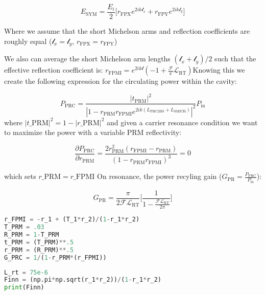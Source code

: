 \begin{equation} E_\mathrm{SYM}  = \frac{E_i}{2} \Big[ r_\mathrm{FPX}e^{2ik\mathscr{l}_x} + r_\mathrm{FPY}e^{2ik\mathscr{l}_y} \Big] \end{equation}

Where we assume that the short Michelson arms and reflection
coefficients are roughly equal (\(\mathscr{l}_x = \mathscr{l}_y\),
\(r_\mathrm{FPX} = r_\mathrm{FPY}\))

We also can average the short Michelson arm lengths
\((\mathscr{l}_x + \mathscr{l}_y)/2\) such that the effective reflection
coefficient is:
\(r_\mathrm{FPMI} = e^{2ik\mathscr{l}}(- 1 + \frac{\mathcal{F}}{\pi} \mathscr{L}_\mathrm{RT})\)Knowing
this we create the following expression for the circulating power within
the cavity:

\begin{equation} P_\mathrm{PRC} = \frac{|t_\mathrm{PRM}| ^2}{|1-r_\mathrm{PRM} r_\mathrm{FPMI} e^{2ik(L_\mathrm{PRC2BS} + L_\mathrm{SMICH})}| ^2} P_\mathrm{in}\end{equation} where
$ | t\_\mathrm{PRM} | ^2 = 1 - | r\_\mathrm{PRM} | ^ 2 $ and given a carrier resonance
condition we want to maximize the power with a variable PRM
reflectivity:

\begin{equation}\frac{\partial P_\mathrm{PRC}}{\partial r_\mathrm{PRM}} = \frac{2r_\mathrm{PRM}^2(r_\mathrm{FPMI} - r_\mathrm{PRM})}{(1 - r_\mathrm{PRM} r_\mathrm{FPMI})^3} = 0\end{equation}

which sets $ r\_\mathrm{PRM} = r\_\mathrm{FPMI} $ On resonance, the
power recyling gain
(\(G_\mathrm{PR} = \frac{P_\mathrm{PRC}}{P_\mathrm{in}}\)):

\begin{equation} G_\mathrm{PR} = \frac{\pi}{2 \mathcal{F} \mathscr{L}_\mathrm{RT}} \Bigg[ \frac{1}{1- \frac{\mathcal{F}\mathscr{L}_\mathrm{RT}}{2 \pi}} \Bigg] \end{equation}

\begin{spacing}{1.2}\begin{lstlisting}[frame=single, language=Python]
r_FPMI = -r_1 + (T_1*r_2)/(1-r_1*r_2)
T_PRM = .03
R_PRM = 1-T_PRM
t_PRM = (T_PRM)**.5
r_PRM = (R_PRM)**.5
G_PRC = 1/(1-r_PRM*(r_FPMI))
\end{lstlisting}\end{spacing}

\begin{spacing}{1.2}\begin{lstlisting}[frame=single, language=Python]
L_rt = 75e-6
Finn = (np.pi*np.sqrt(r_1*r_2))/(1-r_1*r_2)
print(Finn)
\end{lstlisting}\end{spacing}

